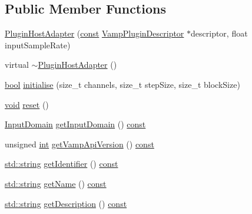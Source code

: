 \subsection*{Public Member Functions}
\begin{DoxyCompactItemize}
\item 
\hyperlink{class_vamp_1_1_plugin_host_adapter_a6535abd551acfbbaab381bbe1268cd49}{Plugin\+Host\+Adapter} (\hyperlink{getopt1_8c_a2c212835823e3c54a8ab6d95c652660e}{const} \hyperlink{vamp_8h_aa1d6e0792099b9516a89b5fb7ed2ad2b}{Vamp\+Plugin\+Descriptor} $\ast$descriptor, float input\+Sample\+Rate)
\item 
virtual \hyperlink{class_vamp_1_1_plugin_host_adapter_ab0f354cb332852ab1892488f6b8e8c0e}{$\sim$\+Plugin\+Host\+Adapter} ()
\item 
\hyperlink{mac_2config_2i386_2lib-src_2libsoxr_2soxr-config_8h_abb452686968e48b67397da5f97445f5b}{bool} \hyperlink{class_vamp_1_1_plugin_host_adapter_add6a2f1ee7e47bd97fa599cead14b738}{initialise} (size\+\_\+t channels, size\+\_\+t step\+Size, size\+\_\+t block\+Size)
\item 
\hyperlink{sound_8c_ae35f5844602719cf66324f4de2a658b3}{void} \hyperlink{class_vamp_1_1_plugin_host_adapter_a5d54c5bbd76bc27b7a243827148afeaa}{reset} ()
\item 
\hyperlink{class_vamp_1_1_plugin_a39cb7649d6dcc20e4cb1640cd55907bc}{Input\+Domain} \hyperlink{class_vamp_1_1_plugin_host_adapter_a9c5239a4da67f1a426cd059e1a2856eb}{get\+Input\+Domain} () \hyperlink{getopt1_8c_a2c212835823e3c54a8ab6d95c652660e}{const} 
\item 
unsigned \hyperlink{xmltok_8h_a5a0d4a5641ce434f1d23533f2b2e6653}{int} \hyperlink{class_vamp_1_1_plugin_host_adapter_a98aadddc8403eb46c9d8c5a9d1fdd19e}{get\+Vamp\+Api\+Version} () \hyperlink{getopt1_8c_a2c212835823e3c54a8ab6d95c652660e}{const} 
\item 
\hyperlink{test__lib_f_l_a_c_2format_8c_ab02026ad0de9fb6c1b4233deb0a00c75}{std\+::string} \hyperlink{class_vamp_1_1_plugin_host_adapter_ab27423a656f878d97d2ad2eba4e76c7a}{get\+Identifier} () \hyperlink{getopt1_8c_a2c212835823e3c54a8ab6d95c652660e}{const} 
\item 
\hyperlink{test__lib_f_l_a_c_2format_8c_ab02026ad0de9fb6c1b4233deb0a00c75}{std\+::string} \hyperlink{class_vamp_1_1_plugin_host_adapter_a45f1d0377e233eeddd1b7cefb48be62a}{get\+Name} () \hyperlink{getopt1_8c_a2c212835823e3c54a8ab6d95c652660e}{const} 
\item 
\hyperlink{test__lib_f_l_a_c_2format_8c_ab02026ad0de9fb6c1b4233deb0a00c75}{std\+::string} \hyperlink{class_vamp_1_1_plugin_host_adapter_a5eaafcef030e81b90a3e77cf16cf8ae1}{get\+Description} () \hyperlink{getopt1_8c_a2c212835823e3c54a8ab6d95c652660e}{const} 

\end{DoxyCompactItemize}
